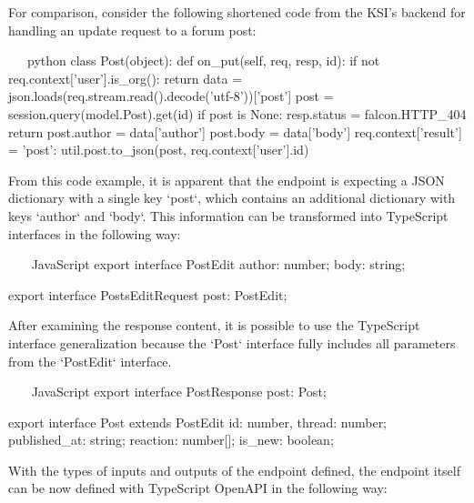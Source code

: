\documentclass[
  digital, %
  oneside, %
  lof,     %
  nolot,     %
]{fithesis4}
\begin{document}
For comparison, consider the following shortened code from the \acrshort{KSI}'s backend for handling an update request to a forum post:

\newpage
~~~python
class Post(object):
    def on_put(self, req, resp, id):
        if not req.context['user'].is_org():
            return
        data = json.loads(req.stream.read().decode('utf-8'))['post']
        post = session.query(model.Post).get(id)
        if post is None:
            resp.status = falcon.HTTP_404
            return
        post.author = data['author']
        post.body = data['body']
        req.context['result'] = {'post': util.post.to_json(post, req.context['user'].id)}
~~~


From this code example, it is apparent that the endpoint is expecting a \acrshort{JSON} dictionary with a single key `post`, which contains an additional dictionary with keys `author` and `body`. This information can be transformed into TypeScript interfaces in the following way:


~~~ JavaScript
export interface PostEdit {
    author: number;
    body: string;
}

export interface PostsEditRequest {
    post: PostEdit;
}
~~~

After examining the response content, it is possible to use the TypeScript interface generalization because the `Post` interface fully includes all parameters from the `PostEdit` interface.

~~~ JavaScript
export interface PostResponse {
    post: Post;
}

export interface Post extends PostEdit {
    id: number,
    thread: number;
    published_at: string;
    reaction: number[];
    is_new: boolean;
}
~~~

With the types of inputs and outputs of the endpoint defined, the endpoint itself can be now defined with TypeScript OpenAPI in the following way:
\end{document}
